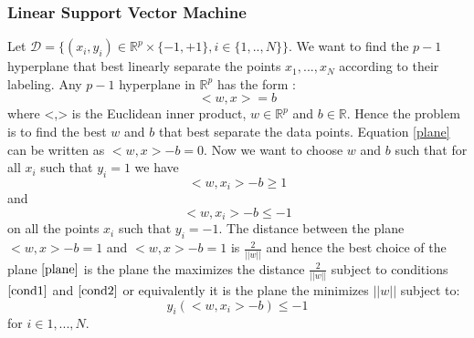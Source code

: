 \documentclass[11pt,oneside,reqno]{amsart}
\theoremstyle{definition}
\theoremstyle{definition}
\theoremstyle{remark}
\numberwithin{equation}{section}
\numberwithin{equation}{section}
\begin{document}
\subsubsection{Linear Support Vector Machine}
Let $\mathcal{D}=\{(x_i,y_i)\in \mathbb{R}^p\times \{-1,+1\} ,i\in \{1,..,N\} \}$. We want to find the $p-1$ hyperplane that best linearly separate the points $x_1,...,x_N$ according to their labeling. Any $p-1$ hyperplane in $\mathbb{R}^p$ has the form :\
\begin{equation}
\label{plane}
<w,x>=b
\end{equation}   
where <,> is the Euclidean inner product, $w\in \mathbb{R}^p$ and $b\in \mathbb{R}$. Hence the problem is to find the best $w$ and $b$ that best separate the data points. Equation \ref{plane} can be written as $<w,x>-b=0$. Now we want to choose $w$ and $b$ such that for all $x_i$ such that $y_i=1$ we have
\begin{equation}
\label{cond1}
<w,x_i>-b \geq 1
\end{equation}
and
\begin{equation}
\label{cond2}
<w,x_i>-b \leq -1
\end{equation}  
on all the points $x_i$ such that $y_i=-1$. The distance between the plane $<w,x>-b=1$ and $<w,x>-b=1$ is $\frac{2}{||w||}$ and hence the best choice of the plane $\ref{plane}$ is the plane the maximizes the distance $\frac{2}{||w||}$ subject to conditions $\ref{cond1}$ and $\ref{cond2}$ or equivalently it is the plane the minimizes $||w||$ subject to:
\begin{equation}
y_i(<w,x_i>-b) \leq -1
\end{equation} 
for $i \in {1,...,N}$.
\end{document}
